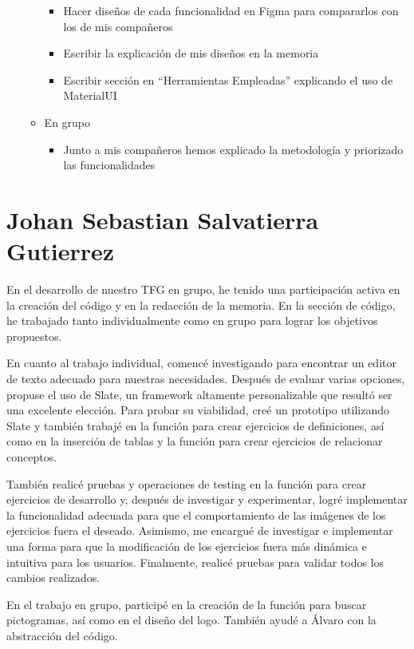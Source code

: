\begin{itemize}
\begin{itemize}
\begin{itemize}
                        \item Hacer diseños de cada funcionalidad en Figma para compararlos con los de mis compañeros
                        \item Escribir la explicación de mis diseños en la memoria
                        \item Escribir sección en “Herramientas Empleadas” explicando el uso de MaterialUI
                    \end{itemize}
              \item En grupo
                    \begin{itemize}
                        \item Junto a mis compañeros hemos explicado la metodología y priorizado las funcionalidades
                    \end{itemize}
          \end{itemize}
\end{itemize}

\section{Johan Sebastian Salvatierra Gutierrez}
En el desarrollo de nuestro TFG en grupo, he tenido una participación activa en la creación del código y en la redacción de la memoria. En la sección de código, he trabajado tanto individualmente como en grupo para lograr los objetivos propuestos.

En cuanto al trabajo individual, comencé investigando para encontrar un editor de texto adecuado para nuestras necesidades. Después de evaluar varias opciones, propuse el uso de Slate, un framework altamente personalizable que resultó ser una excelente elección. Para probar su viabilidad, creé un prototipo utilizando Slate y también trabajé en la función para crear ejercicios de definiciones, así como en la inserción de tablas y la función para crear ejercicios de relacionar conceptos.

También realicé pruebas y operaciones de testing en la función para crear ejercicios de desarrollo y, después de investigar y experimentar, logré implementar la funcionalidad adecuada para que el comportamiento de las imágenes de los ejercicios fuera el deseado. Asimismo, me encargué de investigar e implementar una forma para que la modificación de los ejercicios fuera más dinámica e intuitiva para los usuarios. Finalmente, realicé pruebas para validar todos los cambios realizados.

En el trabajo en grupo, participé en la creación de la función para buscar pictogramas, así como en el diseño del logo. También ayudé a Álvaro con la abstracción del código.

